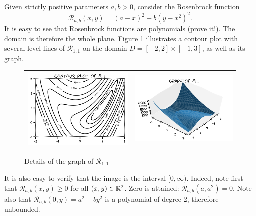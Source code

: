\begin{example}\label{example:Rosenbrock}
Given strictly positive parameters $a,b > 0$, consider the Rosenbrock function 
\begin{equation*} 
\mathcal{R}_{a,b}(x, y) = (a-x)^2 + b(y-x^2)^2.
\end{equation*}
It is easy to see that Rosenbrock functions are polynomials (prove it!).  The domain is therefore the whole plane. Figure \ref{figure:Rosenbrock} illustrates a contour plot with several level lines of $\mathcal{R}_{1,1}$ on the domain $D = [-2,2] \times [-1,3]$, as well as its graph.

\begin{figure}[ht!]
\begin{tabular}{cc}
\includegraphics[width=0.5\linewidth]{rosenbrockContour} &
\includegraphics[width=0.5\linewidth]{rosenbrockGraph}
\end{tabular}
\caption{Details of the graph of $\mathcal{R}_{1,1}$}
\label{figure:Rosenbrock}
\end{figure}
It is also easy to verify that the image is the interval $[0,\infty)$.  Indeed, note first that $\mathcal{R}_{a,b}(x,y) \geq 0$ for all $(x,y) \in \mathbb{R}^2$.  Zero is attained: $\mathcal{R}_{a,b} (a,a^2) = 0$.  Note also that $\mathcal{R}_{a,b}(0,y) = a^2 + by^2$ is a polynomial of degree 2, therefore unbounded.


\end{example}

